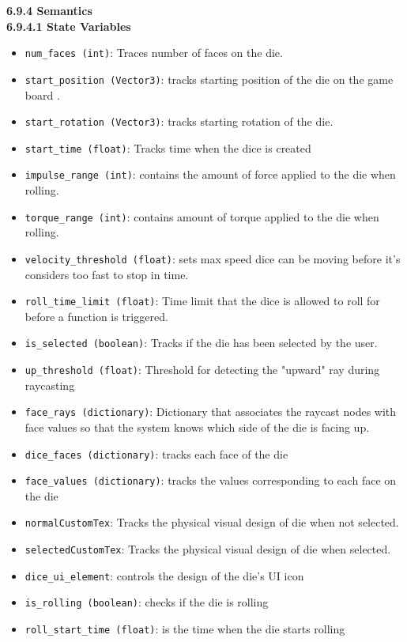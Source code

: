 \documentclass[12pt, titlepage]{article}
\begin{document}
\noindent \textbf{6.9.4 Semantics}\\
\textbf{6.9.4.1 State Variables}\\
\begin{itemize}
	\item \texttt{num\_faces (int)}: Traces number of faces on the die.
	\item \texttt{start\_position (Vector3)}: tracks starting position of the die on the game board .
	\item \texttt{start\_rotation (Vector3)}: tracks starting rotation of the die.
	\item \texttt{start\_time (float)}: Tracks time when the dice is created
	\item \texttt{impulse\_range (int)}: contains the amount of force applied to the die when rolling.
	\item \texttt{torque\_range (int)}: contains amount of torque applied to the die when rolling.
	\item \texttt{velocity\_threshold (float)}: sets max speed dice can be moving before it's considers too fast to stop in time.
	\item \texttt{roll\_time\_limit (float)}: Time limit that the dice is allowed to roll for before a function is triggered.
	\item \texttt{is\_selected (boolean)}: Tracks if the die has been selected by the user.
	\item \texttt{up\_threshold (float)}: Threshold for detecting the "upward" ray during raycasting
	\item \texttt{face\_rays (dictionary)}: Dictionary that associates the raycast nodes with face values so that the system knows which side of the die is facing up.
	\item \texttt{dice\_faces (dictionary)}: tracks each face of the die
	\item \texttt{face\_values (dictionary)}: tracks the values corresponding to each face on the die
	\item \texttt{normalCustomTex}: Tracks the physical visual design of die when not selected.
	\item \texttt{selectedCustomTex}: Tracks the physical visual design of die when selected.
	\item \texttt{dice\_ui\_element}: controls the design of the die's UI icon

	\item \texttt{is\_rolling (boolean)}: checks if the die is rolling

	\item \texttt{roll\_start\_time (float)}: is the time when the die starts rolling
\end{itemize}
\end{document}
